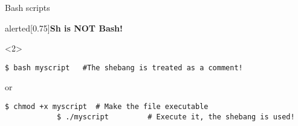 \begin{frame}[fragile]{Bash scripts}
\begin{varblock}{alerted}[0.75\textwidth]{\textbf{Sh is NOT Bash!}}
    \end{varblock}
    \begin{onlyenv}<2>
        \begin{lstlisting}[style=MyBash]
            $ bash myscript   #The shebang is treated as a comment!
        \end{lstlisting}
        \centerline{or}
        \begin{lstlisting}[style=MyBash]
            $ chmod +x myscript  # Make the file executable
            $ ./myscript         # Execute it, the shebang is used!
        \end{lstlisting}
    \end{onlyenv}
\end{frame}


